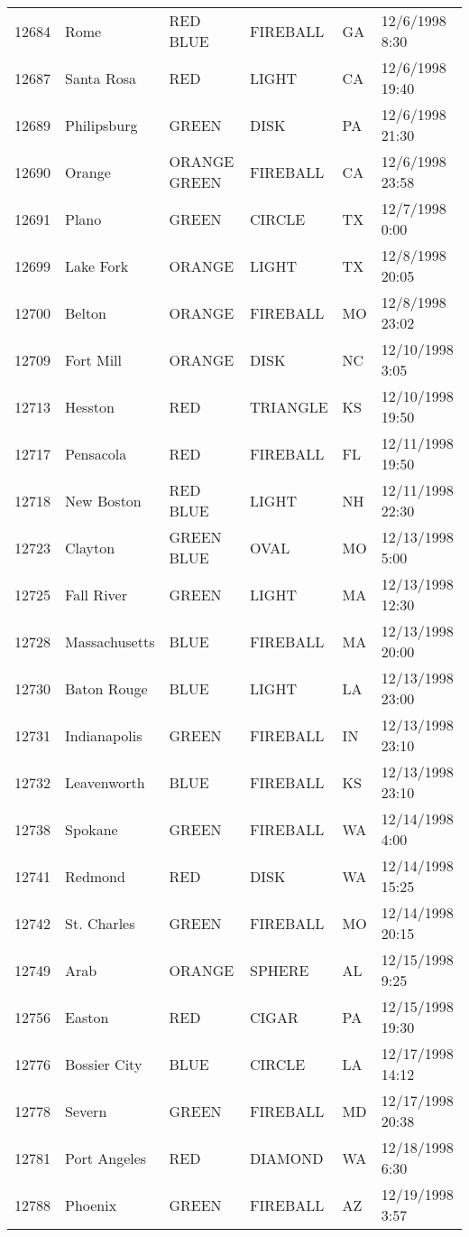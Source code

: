 \begin{tabular}{llllll}
12684 & Rome & RED BLUE & FIREBALL & GA & 12/6/1998 8:30 \\
12687 & Santa Rosa & RED & LIGHT & CA & 12/6/1998 19:40 \\
12689 & Philipsburg & GREEN & DISK & PA & 12/6/1998 21:30 \\
12690 & Orange & ORANGE GREEN & FIREBALL & CA & 12/6/1998 23:58 \\
12691 & Plano & GREEN & CIRCLE & TX & 12/7/1998 0:00 \\
12699 & Lake Fork & ORANGE & LIGHT & TX & 12/8/1998 20:05 \\
12700 & Belton & ORANGE & FIREBALL & MO & 12/8/1998 23:02 \\
12709 & Fort Mill & ORANGE & DISK & NC & 12/10/1998 3:05 \\
12713 & Hesston & RED & TRIANGLE & KS & 12/10/1998 19:50 \\
12717 & Pensacola & RED & FIREBALL & FL & 12/11/1998 19:50 \\
12718 & New Boston & RED BLUE & LIGHT & NH & 12/11/1998 22:30 \\
12723 & Clayton & GREEN BLUE & OVAL & MO & 12/13/1998 5:00 \\
12725 & Fall River & GREEN & LIGHT & MA & 12/13/1998 12:30 \\
12728 & Massachusetts & BLUE & FIREBALL & MA & 12/13/1998 20:00 \\
12730 & Baton Rouge & BLUE & LIGHT & LA & 12/13/1998 23:00 \\
12731 & Indianapolis & GREEN & FIREBALL & IN & 12/13/1998 23:10 \\
12732 & Leavenworth & BLUE & FIREBALL & KS & 12/13/1998 23:10 \\
12738 & Spokane & GREEN & FIREBALL & WA & 12/14/1998 4:00 \\
12741 & Redmond & RED & DISK & WA & 12/14/1998 15:25 \\
12742 & St. Charles & GREEN & FIREBALL & MO & 12/14/1998 20:15 \\
12749 & Arab & ORANGE & SPHERE & AL & 12/15/1998 9:25 \\
12756 & Easton & RED & CIGAR & PA & 12/15/1998 19:30 \\
12776 & Bossier City & BLUE & CIRCLE & LA & 12/17/1998 14:12 \\
12778 & Severn & GREEN & FIREBALL & MD & 12/17/1998 20:38 \\
12781 & Port Angeles & RED & DIAMOND & WA & 12/18/1998 6:30 \\
12788 & Phoenix & GREEN & FIREBALL & AZ & 12/19/1998 3:57 \\

\end{tabular}
